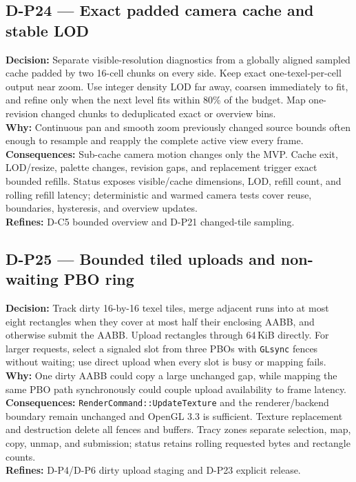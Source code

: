 \subsection*{D-P24 --- Exact padded camera cache and stable LOD}
\begin{decisionbox}[title={D-P24 \quad 2026-08-09}]
\textbf{Decision:} Separate visible-resolution diagnostics from a globally
aligned sampled cache padded by two 16-cell chunks on every side. Keep exact
one-texel-per-cell output near zoom. Use integer density LOD far away, coarsen
immediately to fit, and refine only when the next level fits within 80\% of the
budget. Map one-revision changed chunks to deduplicated exact or overview bins.\\
\textbf{Why:} Continuous pan and smooth zoom previously changed source bounds
often enough to resample and reapply the complete active view every frame.\\
\textbf{Consequences:} Sub-cache camera motion changes only the MVP. Cache exit,
LOD/resize, palette changes, revision gaps, and replacement trigger exact
bounded refills. Status exposes visible/cache dimensions, LOD, refill count,
and rolling refill latency; deterministic and warmed camera tests cover reuse,
boundaries, hysteresis, and overview updates.\\
\textbf{Refines:} D-C5 bounded overview and D-P21 changed-tile sampling.
\end{decisionbox}

\subsection*{D-P25 --- Bounded tiled uploads and non-waiting PBO ring}
\begin{decisionbox}[title={D-P25 \quad 2026-08-09}]
\textbf{Decision:} Track dirty 16-by-16 texel tiles, merge adjacent runs into at
most eight rectangles when they cover at most half their enclosing AABB, and
otherwise submit the AABB. Upload rectangles through 64\,KiB directly. For
larger requests, select a signaled slot from three PBOs with \texttt{GLsync}
fences without waiting; use direct upload when every slot is busy or mapping
fails.\\
\textbf{Why:} One dirty AABB could copy a large unchanged gap, while mapping the
same PBO path synchronously could couple upload availability to frame latency.\\
\textbf{Consequences:} \texttt{RenderCommand::UpdateTexture} and the
renderer/backend boundary remain unchanged and OpenGL 3.3 is sufficient.
Texture replacement and destruction delete all fences and buffers. Tracy zones
separate selection, map, copy, unmap, and submission; status retains rolling
requested bytes and rectangle counts.\\
\textbf{Refines:} D-P4/D-P6 dirty upload staging and D-P23 explicit release.
\end{decisionbox}

